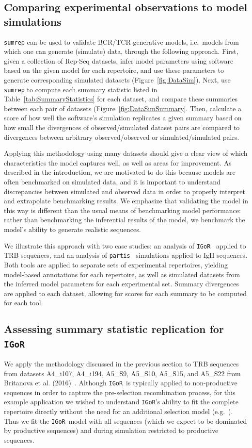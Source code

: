 \documentclass{article}
\newcommand{\partis}{\texttt{partis}}
\newcommand{\igor}{\texttt{IGoR}}
\begin{document}
\subsection*{Comparing experimental observations to model simulations}
\texttt{sumrep} can be used to validate BCR/TCR generative models, i.e.\ models from which one can generate (simulate) data, through the following approach.
First, given a collection of Rep-Seq datasets, infer model parameters using software based on the given model for each repertoire, and use these parameters to generate corresponding simulated datasets (Figure~\ref{fig:DataSim}).
Next, use \texttt{sumrep} to compute each summary statistic listed in Table~\ref{tab:SummaryStatistics} for each dataset, and compare these summaries between each pair of datasets (Figure~\ref{fig:DataSimSummary}.
Then, calculate a score of how well the software's simulation replicates a given summary based on how small the divergences of observed/simulated dataset pairs are compared to divergences between arbitrary observed/observed or simulated/simulated pairs.

Applying this methodology using many datasets should give a clear view of which characteristics the model captures well, as well as areas for improvement.
As described in the introduction, we are motivated to do this because models are often benchmarked on simulated data, and it is important to understand discrepancies between simulated and observed data in order to properly interpret and extrapolate benchmarking results.
We emphasize that validating the model in this way is different than the usual means of benchmarking model performance: rather than benchmarking the inferential results of the model, we benchmark the model's ability to generate realistic sequences.

We illustrate this approach with two case studies:
an analysis of \igor~\cite{Marcou2018-du} applied to TRB sequences, and an analysis of \partis~\cite{Ralph2016-nw, Ralph2016-iz} simulations applied to IgH sequences.
Both tools are applied to separate sets of experimental repertoires, yielding model-based annotations for each repertoire, as well as simulated datasets from the inferred model parameters for each experimental set.
Summary divergences are applied to each dataset, allowing for scores for each summary to be computed for each tool.

\subsection*{Assessing summary statistic replication for \igor}
We apply the methodology discussed in the previous section to TRB sequences from datasets A4\_i107, A4\_i194, A5\_S9, A5\_S10, A5\_S15, and A5\_S22 from Britanova et al. (2016)~\cite{Britanova2016-iw}.
Although \igor\ is typically applied to non-productive sequences in order to capture the pre-selection recombination process, for this example application we wished to understand \igor's ability to fit the complete repertoire directly without the need for an additional selection model (e.g.\ \cite{Elhanati2014-mf}).
Thus we fit the \igor\ model with all sequences (which we expect to be dominated by productive sequences) and during simulation restricted to productive sequences.
\end{document}
